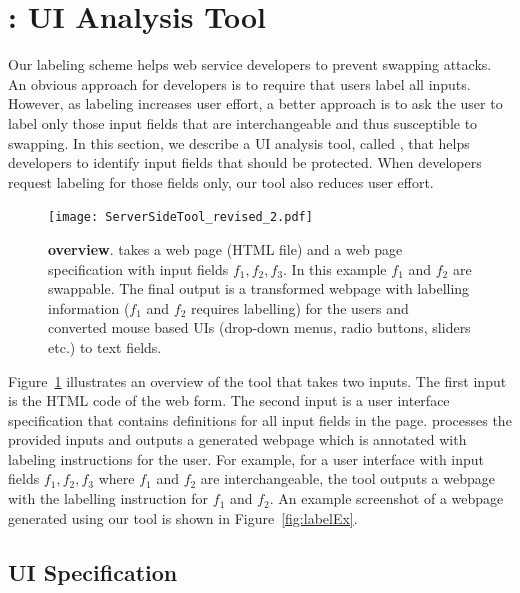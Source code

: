 \section{\tool: UI Analysis Tool}
\label{sec:integriTool}

Our labeling scheme helps web service developers to prevent swapping attacks. An obvious approach for developers is to require that users label all inputs. However, as labeling increases user effort, a better approach is to ask the user to label only those input fields that are interchangeable and thus susceptible to swapping. In this section, we describe a UI analysis tool, called \tool, that helps developers to identify input fields that should be protected. When developers request labeling for those fields only, our tool also reduces user effort.

\begin{figure}[t]
 \centering
 \texttt{[image: ServerSideTool\_revised\_2.pdf]}
 \caption{\textbf{\tool overview}. \tool takes a web page (HTML file) and a web page specification with input fields $f_1, f_2, f_3$. In this example $f_1$ and $f_2$ are swappable. The final output is a transformed webpage with labelling information ($f_1$ and $f_2$ requires labelling) for the users and converted mouse based UIs (drop-down menus, radio buttons, sliders etc.) to text fields. 
 }
 \label{fig:tool}
\end{figure}

Figure~\ref{fig:tool} illustrates an overview of the tool that takes two inputs. The first input is the HTML code of the web form. The second input is a user interface specification that contains definitions for all input fields in the page. \tool processes the provided inputs and outputs a generated webpage which is annotated with labeling instructions for the user. For example, for a user interface with input fields $f_1, f_2, f_3$ where $f_1$ and $f_2$ are interchangeable, the tool outputs a webpage with the labelling instruction for $f_1$ and $f_2$. An example screenshot of a webpage generated using our tool is shown in Figure~\ref{fig:labelEx}.
 

\subsection{UI Specification} 
\label{sec:integriTool:specification}

